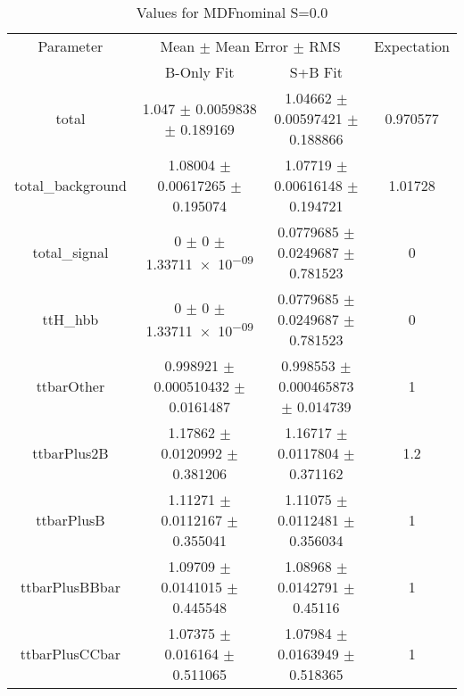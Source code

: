\begin{table}
\centering
\caption{Values for MDFnominal S=0.0}
\begin{tabular}{cccc}
\toprule
Parameter & \multicolumn{2}{c}{Mean $\pm$ Mean Error $\pm$ RMS} & Expectation\\
 & B-Only Fit & S+B Fit & \\
\midrule
total & \num{1.047} $\pm$ \num{0.0059838} $\pm$ \num{0.189169} & \num{1.04662} $\pm$ \num{0.00597421} $\pm$ \num{0.188866} & \num{0.970577}\\
total\_background & \num{1.08004} $\pm$ \num{0.00617265} $\pm$ \num{0.195074} & \num{1.07719} $\pm$ \num{0.00616148} $\pm$ \num{0.194721} & \num{1.01728}\\
total\_signal & \num{0} $\pm$ \num{0} $\pm$ \num{1.33711e-09} & \num{0.0779685} $\pm$ \num{0.0249687} $\pm$ \num{0.781523} & \num{0}\\
ttH\_hbb & \num{0} $\pm$ \num{0} $\pm$ \num{1.33711e-09} & \num{0.0779685} $\pm$ \num{0.0249687} $\pm$ \num{0.781523} & \num{0}\\
ttbarOther & \num{0.998921} $\pm$ \num{0.000510432} $\pm$ \num{0.0161487} & \num{0.998553} $\pm$ \num{0.000465873} $\pm$ \num{0.014739} & \num{1}\\
ttbarPlus2B & \num{1.17862} $\pm$ \num{0.0120992} $\pm$ \num{0.381206} & \num{1.16717} $\pm$ \num{0.0117804} $\pm$ \num{0.371162} & \num{1.2}\\
ttbarPlusB & \num{1.11271} $\pm$ \num{0.0112167} $\pm$ \num{0.355041} & \num{1.11075} $\pm$ \num{0.0112481} $\pm$ \num{0.356034} & \num{1}\\
ttbarPlusBBbar & \num{1.09709} $\pm$ \num{0.0141015} $\pm$ \num{0.445548} & \num{1.08968} $\pm$ \num{0.0142791} $\pm$ \num{0.45116} & \num{1}\\
ttbarPlusCCbar & \num{1.07375} $\pm$ \num{0.016164} $\pm$ \num{0.511065} & \num{1.07984} $\pm$ \num{0.0163949} $\pm$ \num{0.518365} & \num{1}\\
\bottomrule
\end{tabular}
\end{table}